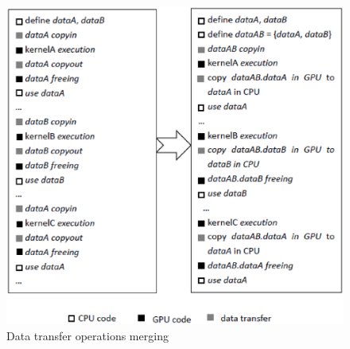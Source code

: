 \documentclass[10pt,conference]{IEEEtran}
\begin{document}
\begin{figure}
 \centering
 \includegraphics[width=5in]{image007.eps}
 \caption{Data transfer operations merging}\label{figure2}
\end{figure}
\end{document}
